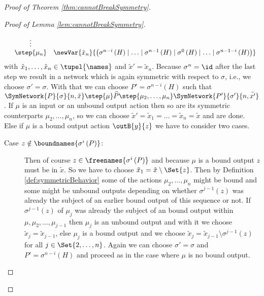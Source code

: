 \documentclass[11pt,techReport]{eptcs}
\begin{document}
\begin{proof}[Proof of Theorem \ref{thm:cannotBreakSymmetry}]
\begin{proof}[Proof of Lemma \ref{lem:cannotBreakSymmetry}]
\begin{description}
\begin{align*}
\begin{array}{lcl}
					& \vdots\\
					& \step{\mu_n} & \newVar{\tilde{x}_n}{\left( \sigma^{n{-}i}\left( H \right) \mid \ldots \mid \sigma^{n{-}1}\left( H \right) \mid \sigma^0\left( H \right) \mid \ldots \mid \sigma^{n{-}1{-}i}\left( H \right) \right)}
				\end{array}
			\end{align*}
			with $ \tilde{x}_1, \ldots, \tilde{x}_n \in \tupel{\names} $ and $ \tilde{x}' = \tilde{x}_n $. Because $ \sigma^n = \id $ after the last step we result in a network which is again symmetric with respect to $ \sigma $, i.e., we choose $ \sigma' = \sigma $. With that we can choose $ P' = \sigma^{n{-}i}\left( H \right) $ such that $ \SymNetwork{P}{\sigma}{n, \tilde{x}} \step{\mu} \widehat{P} \step{\mu_2, \ldots, \mu_n} \SymNetwork{P'}{\sigma'}{n, \tilde{x'}} $. If $ \mu $ is an input or an unbound output action then so are its symmetric counterparts $ \mu_2, \ldots, \mu_n $, so we can choose $ \tilde{x}' = \tilde{x}_1 = \ldots = \tilde{x}_n = \tilde{x} $ and are done. Else if $ \mu $ is a bound output action $ \outB{y}{z} $ we have to consider two cases.
			\begin{description}
				\item[Case $ z \notin \boundnames{\sigma^i\left( P \right)} $:] Then of course $ z \in \freenames{\sigma^i\left( P \right)} $ and because $ \mu $ is a bound output $ z $ must be in $ \tilde{x} $. So we have to choose $ \tilde{x}_1 = \tilde{x} \setminus \Set{ z } $. Then by Definition \ref{def:symmetricBehavior} some of the actions $ \mu_2, \ldots, \mu_n $ might be bound and some might be unbound outputs depending on whether $ \sigma^{j{-}1}\left( z \right) $ was already the subject of an earlier bound output of this sequence or not. If $ \sigma^{j{-}1}\left( z \right) $ of $ \mu_j $ was already the subject of an bound output within $ \mu, \mu_2, \ldots, \mu_{j{-}1} $ then $ \mu_j $ is an unbound output and with it we choose $ \tilde{x}_j = \tilde{x}_{j{-}1} $, else $ \mu_j $ is a bound output and we choose $ \tilde{x}_j = \tilde{x}_{j{-}1} \setminus \sigma^{j{-}1}\left( z \right) $ for all $ j \in \Set{ 2, \ldots, n } $. Again we can choose $ \sigma' = \sigma $ and $ P' = \sigma^{n{-}i}\left( H \right) $ and proceed as in the case where $ \mu $ is no bound output.

\end{description}
\end{description}
\end{proof}
\end{proof}
\end{document}
